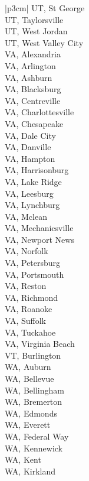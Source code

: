 \begin{customLongTable}{ |p{3cm}| }
UT, St George \\ \hline
UT, Taylorsville \\ \hline
UT, West Jordan \\ \hline
UT, West Valley City \\ \hline
VA, Alexandria \\ \hline
VA, Arlington \\ \hline
VA, Ashburn \\ \hline
VA, Blacksburg \\ \hline
VA, Centreville \\ \hline
VA, Charlottesville \\ \hline
VA, Chesapeake \\ \hline
VA, Dale City \\ \hline
VA, Danville \\ \hline
VA, Hampton \\ \hline
VA, Harrisonburg \\ \hline
VA, Lake Ridge \\ \hline
VA, Leesburg \\ \hline
VA, Lynchburg \\ \hline
VA, Mclean \\ \hline
VA, Mechanicsville \\ \hline
VA, Newport News \\ \hline
VA, Norfolk \\ \hline
VA, Petersburg \\ \hline
VA, Portsmouth \\ \hline
VA, Reston \\ \hline
VA, Richmond \\ \hline
VA, Roanoke \\ \hline
VA, Suffolk \\ \hline
VA, Tuckahoe \\ \hline
VA, Virginia Beach \\ \hline
VT, Burlington \\ \hline
WA, Auburn \\ \hline
WA, Bellevue \\ \hline
WA, Bellingham \\ \hline
WA, Bremerton \\ \hline
WA, Edmonds \\ \hline
WA, Everett \\ \hline
WA, Federal Way \\ \hline
WA, Kennewick \\ \hline
WA, Kent \\ \hline
WA, Kirkland \\ \hline

\end{customLongTable}

